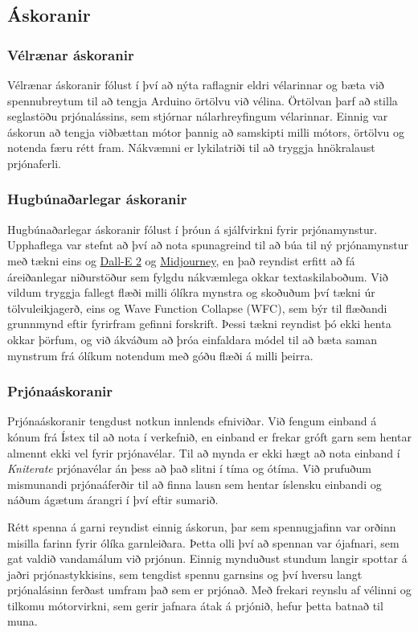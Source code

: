 \documentclass[a4paper,12pt,twoside]{article}
\begin{document}
\subsection{Áskoranir}
\subsubsection{Vélrænar áskoranir}
Vélrænar áskoranir fólust í því að nýta raflagnir eldri vélarinnar og bæta við spennubreytum til að tengja Arduino örtölvu við vélina. Örtölvan þarf að stilla seglastöðu prjónalássins, sem stjórnar nálarhreyfingum vélarinnar. Einnig var áskorun að tengja viðbættan mótor þannig að samskipti milli mótors, örtölvu og notenda færu rétt fram. Nákvæmni er lykilatriði til að tryggja hnökralaust prjónaferli.

\subsubsection{Hugbúnaðarlegar áskoranir}
Hugbúnaðarlegar áskoranir fólust í þróun á sjálfvirkni fyrir prjónamynstur. Upphaflega var stefnt að því að nota spunagreind til að búa til ný prjónamynstur með tækni eins og \href{https://openai.com/index/dall-e-2/}{Dall-E 2} og \href{https://www.midjourney.com/home}{Midjourney}, en það reyndist erfitt að fá áreiðanlegar niðurstöður sem fylgdu nákvæmlega okkar textaskilaboðum. Við vildum tryggja fallegt flæði milli ólíkra mynstra og skoðuðum því tækni úr tölvuleikjagerð, eins og Wave Function Collapse (WFC), sem býr til flæðandi grunnmynd eftir fyrirfram gefinni forskrift. Þessi tækni reyndist þó ekki henta okkar þörfum, og við ákváðum að þróa einfaldara módel til að bæta saman mynstrum frá ólíkum notendum með góðu flæði á milli þeirra.

\subsubsection{Prjónaáskoranir}
Prjónaáskoranir tengdust notkun innlends efniviðar. Við fengum einband á kónum frá Ístex til að nota í verkefnið, en einband er frekar gróft garn sem hentar almennt ekki vel fyrir prjónavélar. Til að mynda er ekki hægt að nota einband í \textit{Kniterate} prjónavélar án þess að það slitni í tíma og ótíma. Við prufuðum mismunandi prjónaáferðir til að finna lausn sem hentar íslensku einbandi og náðum ágætum árangri í því eftir sumarið.

Rétt spenna á garni reyndist einnig áskorun, þar sem spennugjafinn var orðinn misilla farinn fyrir ólíka garnleiðara. Þetta olli því að spennan var ójafnari, sem gat valdið vandamálum við prjónun. Einnig mynduðust stundum langir spottar á jaðri prjónastykkisins, sem tengdist spennu garnsins og því hversu langt prjónalásinn ferðast umfram það sem er prjónað. Með frekari reynslu af vélinni og tilkomu mótorvirkni, sem gerir jafnara átak á prjónið, hefur þetta batnað til muna.
\end{document}
